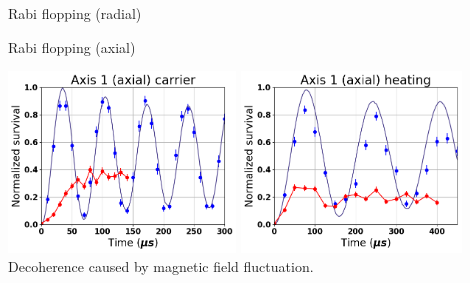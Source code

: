 \documentclass{beamer}
\begin{document}
\begin{frame}{Rabi flopping (radial)}
  \begin{center}
  \end{center}
\end{frame}

\begin{frame}{Rabi flopping (axial)}
  \begin{center}
    \includegraphics[height=4.8cm]{../../experiments/rabi_flop/imgs/fit_20170409_a1_0_ba_nol.png}
    \includegraphics[height=4.8cm]{../../experiments/rabi_flop/imgs/fit_20170409_a1_p1_ba_nol.png}\\
    Decoherence caused by magnetic field fluctuation.
  \end{center}
\end{frame}
\end{document}
